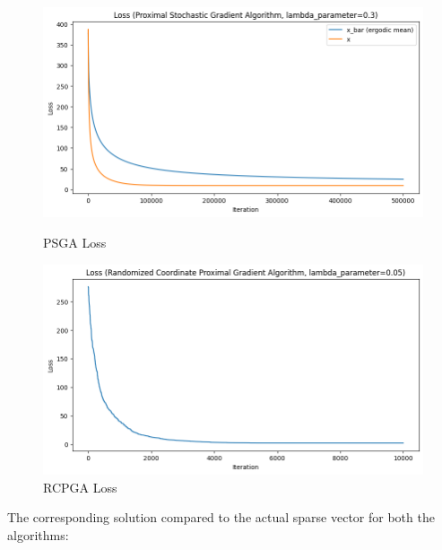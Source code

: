 \documentclass[12pt]{article}
\begin{document}
\begin{figure}[h]
\centering
\begin{minipage}{.5\textwidth}
  \centering
\includegraphics[scale=0.3]{outputs/part_3/psga-loss}
\caption{PSGA Loss}
\label{fig:}
\end{minipage}%
\begin{minipage}{.5\textwidth}
  \centering
\includegraphics[scale=0.3]{outputs/part_3/rcpga-loss}
\caption{RCPGA Loss}
\label{fig:}
\end{minipage}
\end{figure}


The corresponding solution compared to the actual sparse vector for both the algorithms:
\end{document}
